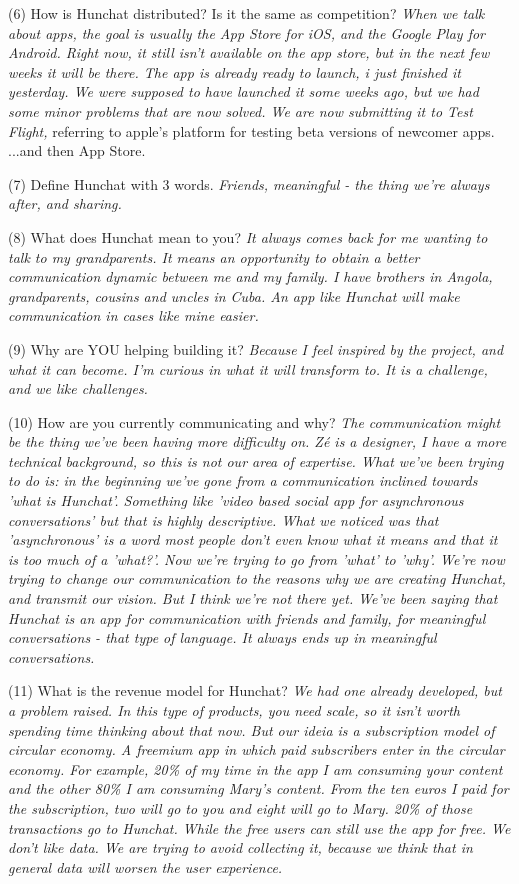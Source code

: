 \documentclass[12pt]{article}
\begin{document}
(6) How is Hunchat distributed? Is it the same as competition? \textit{When we talk about apps, the goal is usually the App Store for iOS, and the Google Play for Android. Right now, it still isn't available on the app store, but in the next few weeks it will be there. The app is already ready to launch, i just finished it yesterday. We were supposed to have launched it some weeks ago, but we had some minor problems that are now solved. We are now submitting it to Test Flight,} referring to apple's platform for testing beta versions of newcomer apps. {...and then App Store.}

(7) Define Hunchat with 3 words.  \textit{Friends, meaningful - the thing we're always after, and sharing.}

(8) What does Hunchat mean to you? \textit{It always comes back for me wanting to talk to my grandparents. It means an opportunity to obtain a better communication dynamic between me and my family. I have brothers in Angola, grandparents, cousins and uncles in Cuba. An app like Hunchat will make communication in cases like mine easier. }

(9) Why are YOU helping building it? \textit{Because I feel inspired by the project, and what it can become. I'm curious in what it will transform to. It is a challenge, and we like challenges.}

(10) How are you currently communicating and why? \textit{The communication might be the thing we've been having more difficulty on. Zé is a designer, I have a more technical background, so this is not our area of expertise. What we've been trying to do is: in the beginning we've gone from a communication inclined towards 'what is Hunchat'. Something like 'video based social app for asynchronous conversations' but that is highly descriptive. What we noticed was that 'asynchronous' is a word most people don't even know what it means and that it is too much of a 'what?'. Now we're trying to go from 'what' to 'why'. We're now trying to change our communication to the reasons why we are creating Hunchat, and transmit our vision. But I think we're not there yet. We've been saying that Hunchat is an app for communication with friends and family, for meaningful conversations - that type of language. It always ends up in meaningful conversations.}

(11) What is the revenue model for Hunchat? \textit{We had one already developed, but a problem raised. In this type of products, you need scale, so it isn't worth spending time thinking about that now. But our ideia is a subscription model of circular economy.  A freemium app in which paid subscribers enter in the circular economy. For example, 20\% of my time in the app I am consuming your content and the other 80\% I am consuming Mary's content. From the ten euros I paid for the subscription, two will go to you and eight will go to Mary. 20\% of those transactions go to Hunchat. While the free users can still use the app for free. We don't like data. We are trying to avoid collecting it, because we think that in general data will worsen the user experience.}
\end{document}
